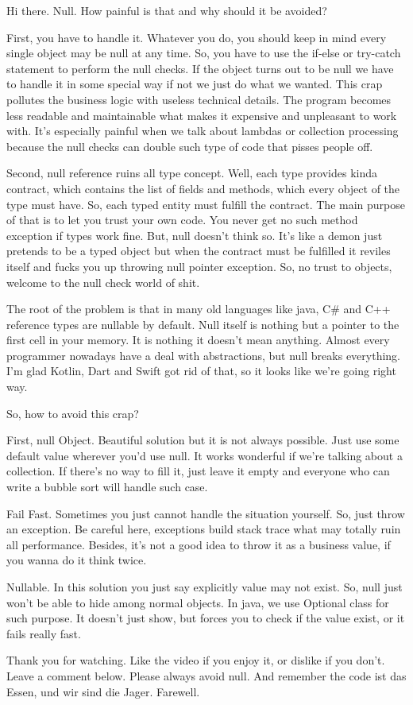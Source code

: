 \documentclass[oneside,final,14pt]{extreport}
\begin{document}
    Hi there.
    Null.
    How painful is that and why should it be avoided?

    First, you have to handle it.
    Whatever you do, you should keep in mind every single object may be null at any time.
    So, you have to use the if-else or try-catch statement to perform the null checks.
    If the object turns out to be null we have to handle it in some special way if not we just do what we wanted.
    This crap pollutes the business logic with useless technical details.
    The program becomes less readable and maintainable what makes it expensive and unpleasant to work with.
    It's especially painful when we talk about lambdas or collection processing because the null checks can double such type of code that pisses people off.

    Second, null reference ruins all type concept.
    Well, each type provides kinda contract, which contains the list of fields and methods, which every object of the type must have.
    So, each typed entity must fulfill the contract.
    The main purpose of that is to let you trust your own code.
    You never get no such method exception if types work fine.
    But, null doesn't think so.
    It's like a demon just pretends to be a typed object but when the contract must be fulfilled it reviles itself and fucks you up throwing null pointer exception.
    So, no trust to objects, welcome to the null check world of shit.

    The root of the problem is that in many old languages like java, C\# and C++ reference types are nullable by default.
    Null itself is nothing but a pointer to the first cell in your memory.
    It is nothing it doesn't mean anything.
    Almost every programmer nowadays have a deal with abstractions, but null breaks everything.
    I'm glad Kotlin, Dart and Swift got rid of that, so it looks like we're going right way.

    So, how to avoid this crap?

    First, null Object.
    Beautiful solution but it is not always possible.
    Just use some default value wherever you'd use null.
    It works wonderful if we're talking about a collection.
    If there's no way to fill it, just leave it empty and everyone who can write a bubble sort will handle such case.

    Fail Fast.
    Sometimes you just cannot handle the situation yourself.
    So, just throw an exception.
    Be careful here, exceptions build stack trace what may totally ruin all performance.
    Besides, it's not a good idea to throw it as a business value, if you wanna do it think twice.

    Nullable.
    In this solution you just say explicitly value may not exist.
    So, null just won't be able to hide among normal objects.
    In java, we use Optional class for such purpose.
    It doesn't just show, but forces you to check if the value exist, or it fails really fast.

    Thank you for watching.
    Like the video if you enjoy it, or dislike if you don't.
    Leave a comment below.
    Please always avoid null.
    And remember the code ist das Essen, und wir sind die Jager.
    Farewell.
\end{document}
